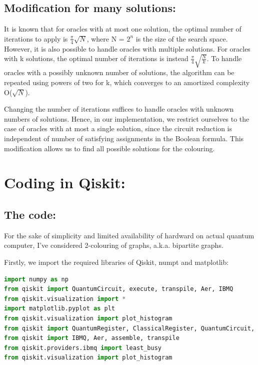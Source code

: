 \documentclass{article}
\begin{document}
\subsection{Modification for many solutions:}

It is known that for oracles with at most one solution, the optimal number of iterations to apply is $\frac{\pi}{4}\sqrt{N}$, where N = $2^n$ is the size of the search space. However, it is also possible to handle oracles with multiple solutions. For
oracles with k solutions, the optimal number of iterations is instead $\frac{\pi}{4}\sqrt{\frac{N}{k}}$. To handle oracles with a possibly unknown number of solutions, the algorithm can be repeated using powers of two for k, which converges to an amortized complexity O($\sqrt{N}$).

Changing the number of iterations suffices to handle oracles with unknown numbers of solutions. Hence, in our
implementation, we restrict ourselves to the case of oracles with at most a single solution, since the circuit reduction
is independent of number of satisfying assignments in the Boolean formula. This modification allows us to find all possible solutions for the colouring.

\section{Coding in Qiskit:}

\subsection{The code:}

For the sake of simplicity and limited availability of hardward on actual quantum computer, I've considered 2-colouring of graphs, a.k.a. bipartite graphs.

Firstly, we import the required libraries of Qiskit, numpt and matplotlib:

\begin{lstlisting}[language=Python]
import numpy as np
from qiskit import QuantumCircuit, execute, transpile, Aer, IBMQ
from qiskit.visualization import *
import matplotlib.pyplot as plt
from qiskit.visualization import plot_histogram
from qiskit import QuantumRegister, ClassicalRegister, QuantumCircuit, IBMQ, execute
from qiskit import IBMQ, Aer, assemble, transpile
from qiskit.providers.ibmq import least_busy
from qiskit.visualization import plot_histogram


\end{lstlisting}
\end{document}
